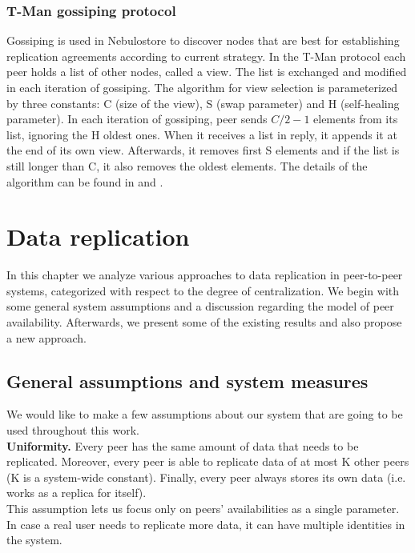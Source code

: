 \documentclass{pracamgren}
\begin{document}
\subsection{T-Man gossiping protocol}

Gossiping is used in Nebulostore to discover nodes that are best for establishing replication agreements according to current strategy. In the T-Man protocol each peer holds a list of other nodes, called a view. The list is exchanged and modified in each iteration of gossiping. The algorithm for view selection is parameterized by three constants: C (size of the view), S (swap parameter) and H (self-healing parameter). In each iteration of gossiping, peer sends $C/2-1$ elements from its list, ignoring the H oldest ones. When it receives a list in reply, it appends it at the end of its own view. Afterwards, it removes first S elements and if the list is still longer than C, it also removes the oldest elements. The details of the algorithm can be found in \cite{gossiping} and \cite{tman}.\\


%
%
%
%

\chapter{Data replication}\label{chap:data_replication}

In this chapter we analyze various approaches to data replication in peer-to-peer systems, categorized with respect to the degree of centralization. We begin with some general system assumptions and a discussion regarding the model of peer availability. Afterwards, we present some of the existing results and also propose a new approach.\\

\section{General assumptions and system measures}\label{sect:assumptions}

We would like to make a few assumptions about our system that are going to be used throughout this work.\\

{\bf Uniformity.} Every peer has the same amount of data that needs to be replicated. Moreover, every peer is able to replicate data of at most K other peers (K is a system-wide constant). Finally, every peer always stores its own data (i.e. works as a replica for itself).\\
This assumption lets us focus only on peers' availabilities as a single parameter. In case a real user needs to replicate more data, it can have multiple identities in the system.\\
\end{document}
